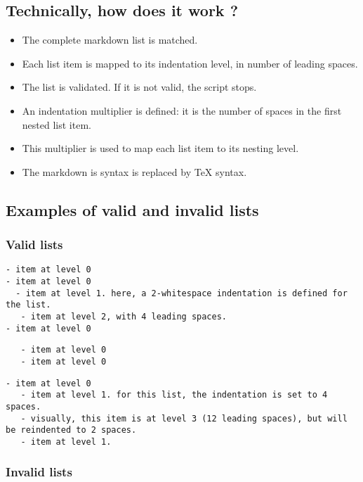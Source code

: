 \documentclass[a4paper, 12pt, twoside]{book}
\begin{document}
\subsection*{Technically, how does it work ?}

\begin{itemize}
\item The complete markdown list is matched.
\item Each list item is mapped to its indentation level, in number of leading spaces.
\item The list is validated. If it is not valid, the script stops.
\item An indentation multiplier is defined: it is the number of spaces in the first nested list item.
\item This multiplier is used to map each list item to its nesting level.
\item The markdown is syntax is replaced by TeX syntax. 
\end{itemize}
\subsection*{Examples of valid and invalid lists}
\subsubsection*{Valid lists}

\begin{lstlisting}
- item at level 0
- item at level 0
  - item at level 1. here, a 2-whitespace indentation is defined for the list.
   - item at level 2, with 4 leading spaces.
- item at level 0
\end{lstlisting}

\begin{lstlisting}
   - item at level 0
   - item at level 0
\end{lstlisting}

\begin{lstlisting}
- item at level 0
   - item at level 1. for this list, the indentation is set to 4 spaces.
   - visually, this item is at level 3 (12 leading spaces), but will be reindented to 2 spaces.
   - item at level 1.
\end{lstlisting}
\subsubsection*{Invalid lists}
\end{document}
